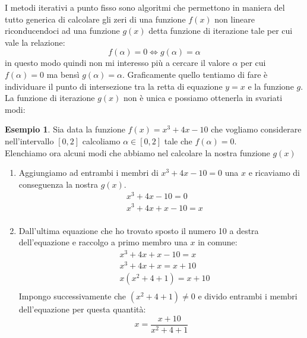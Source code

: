 \documentclass[12pt, a4paper]{book}
\theoremstyle{definition}
\newtheorem{exmp}{Esempio}[section]
\begin{document}
\begin{flushleft}
I metodi iterativi a punto fisso sono algoritmi che permettono in maniera del tutto generica di calcolare gli zeri di una funzione $f(x)$ non lineare riconducendoci ad una funzione $g(x)$ detta funzione di iterazione tale per cui vale la relazione: 
\[ 
	f(\alpha) = 0 \Longleftrightarrow g(\alpha) = \alpha
\]
in questo modo quindi non mi interesso più a cercare il valore $\alpha$ per cui $f(\alpha) = 0$ ma bensì $g(\alpha) = \alpha$.
Graficamente quello tentiamo di fare è individuare il punto di intersezione tra la retta di equazione $y = x$ e la funzione $g$.
La funzione di iterazione $g(x)$ non è unica e possiamo ottenerla in svariati modi:
\begin{exmp}
Sia data la funzione $f(x) = x^{3} + 4x - 10$ che vogliamo considerare nell'intervallo $[0,2]$ calcoliamo $\alpha \in [0,2]$ tale che $f(\alpha) = 0$.\\
\vspace{1em}
Elenchiamo ora alcuni modi che abbiamo nel calcolare la nostra funzione $g(x)$
\begin{enumerate}
	\item Aggiungiamo ad entrambi i membri di $x^{3} + 4x - 10=0$ una $x$ e ricaviamo di conseguenza la nostra $g(x)$.
			\begin{equation}
				\begin{split}
					& x^{3} + 4x - 10=0 \\
					& x^{3} + 4x + x - 10 = x \\
				\end{split}
			\end{equation}
	\item Dall'ultima equazione che  ho trovato sposto il numero 10 a destra dell'equazione e raccolgo a primo membro una $x$ in comune:
		\begin{equation}
				\begin{split}
					& x^{3} + 4x + x - 10 = x \\
					& x^{3} + 4x + x = x + 10 \\
					& x(x^{2} + 4 + 1) = x + 10 \\
				\end{split}
		\end{equation}
	Impongo successivamente che $(x^{2} + 4 + 1) \neq 0 $ e divido entrambi i membri dell'equazione per questa quantità:
	\[ 
		x = \dfrac{x + 10}{x^{2} + 4 + 1}	
	\]
\end{enumerate}
\end{exmp}


\end{flushleft}
\end{document}
